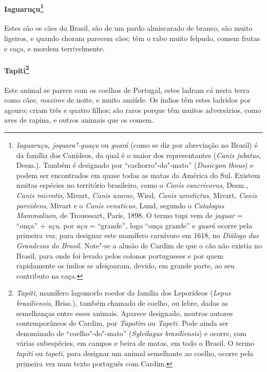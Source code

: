 \paragraph{Iaguaruçu\footnote{ \textit{Iaguaruçu, joquara"-guaçu} ou 
\textit{guará} (como se diz por abreviação no Brasil) é da
família dos Canídeos, da qual é o maior dos representantes (\textit{Canis jubatus}, Desm.). Também é designado por
``cachorro"-do"-mato'' (\textit{Dusicyon thous}) e podem ser encontrados
em quase todas as matas da América do Sul. Existem muitas espécies no
território brasileiro, como o \textit{Canis cancrivorus}, Desm.,
\textit{Canis microtis}, Mivart, \textit{Canis azarae}, Wied,
\textit{Canis urostictus}, Mivart, \textit{Canis parvidens}, Mivart e o
\textit{Canis venaticus}, Lund, segundo o \textit{Catalogus Mammalium}, de Trouessart, Paris, 1898. O termo tupi vem de \textit{jaguar} = 
``onça'' + \textit{uçu}, por \textit{açu} = ``grande'', logo ``onça grande'' 
e \textit{guará} ocorre pela primeira vez, para designar
este mamífero carnívoro em 1618, no \textit{Diálogo das Grandezas do
Brasil.} Note"-se a alusão de Cardim de que o cão não existia no Brasil,
para onde foi levado pelos colonos portugueses e por quem rapidamente
os índios se afeiçoaram, devido, em grande parte, ao seu contributo na
caça.}} Estes são os cães do Brasil, são de um pardo
almiscarado de branco, são muito ligeiros, e quando choram parecem cães;
têm o rabo muito felpudo, comem frutas e caça, e mordem terrivelmente.

\paragraph{Tapiti\footnote{ \textit{Tapiti}, mamífero lagomorfo
roedor da família dos Leporídeos (\textit{Lepus brasiliensis}, Briss.), 
também chamado de coelho, ou lebre, dadas as semelhanças
entre esses animais. Aparece designado, noutros autores contemporâneos
de Cardim, por \textit{Tapotim} ou \textit{Tapeti.} Pode ainda ser
denominado de ``coelho"-do"-mato'' (\textit{Sylvilagus brasiliensis}) e
ocorre, com várias subespécies, em campos e beira de matas, em todo o
Brasil. O termo \textit{tapiti} ou \textit{tapeti}, para designar um
animal semelhante ao coelho, ocorre pela primeira vez num
texto português com Cardim.}} Este animal se parece com os
coelhos de Portugal, estes ladram cá nesta terra como cães,
\textit{maxime} de noite, e muito amiúde. Os índios têm estes ladridos
por agouro; criam três e quatro filhos; são raros porque têm muitos
adversários, como aves de rapina, e outros animais que os comem.

